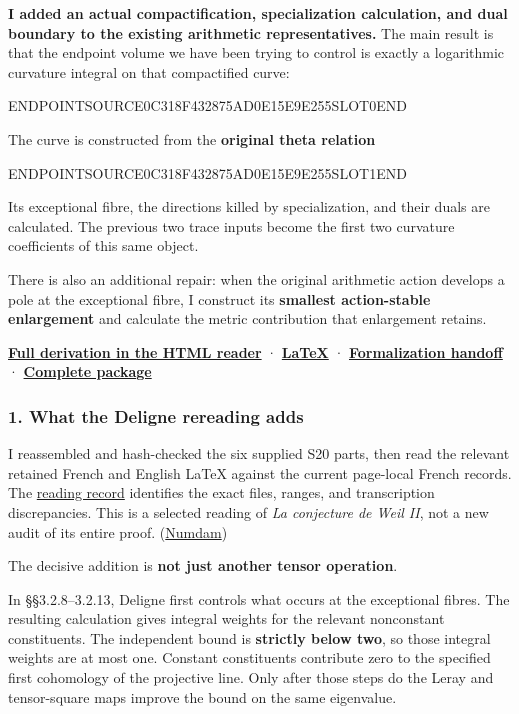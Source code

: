 \textbf{I added an actual compactification, specialization calculation, and dual boundary to the existing arithmetic representatives.} The main result is that the endpoint volume we have been trying to control is exactly a logarithmic curvature integral on that compactified curve:

ENDPOINTSOURCE0C318F432875AD0E15E9E255SLOT0END

The curve is constructed from the \textbf{original theta relation}

ENDPOINTSOURCE0C318F432875AD0E15E9E255SLOT1END

Its exceptional fibre, the directions killed by specialization, and their duals are calculated. The previous two trace inputs become the first two curvature coefficients of this same object.

There is also an additional repair: when the original arithmetic action develops a pole at the exceptional fibre, I construct its \textbf{smallest action-stable enlargement} and calculate the metric contribution that enlargement retains.

\href{sources/endpoint_user_sources/HISTORICAL_DOWNLOAD_LINKS.md}{\textbf{Full derivation in the HTML reader}} · \href{sources/endpoint_user_sources/HISTORICAL_DOWNLOAD_LINKS.md}{\textbf{LaTeX}} · \href{sources/endpoint_user_sources/HISTORICAL_DOWNLOAD_LINKS.md}{\textbf{Formalization handoff}} · \href{sources/endpoint_user_sources/HISTORICAL_DOWNLOAD_LINKS.md}{\textbf{Complete package}}

\subsubsection{1. What the Deligne rereading adds}\label{endpoint-curvature_original--what-the-deligne-rereading-adds}

I reassembled and hash-checked the six supplied S20 parts, then read the relevant retained French and English LaTeX against the current page-local French records. The \href{sources/endpoint_user_sources/HISTORICAL_DOWNLOAD_LINKS.md}{reading record} identifies the exact files, ranges, and transcription discrepancies. This is a selected reading of \emph{La conjecture de Weil II}, not a new audit of its entire proof. (\href{https://www.numdam.org/item/PMIHES_1980__52__137_0/}{Numdam})

The decisive addition is \textbf{not just another tensor operation}.

In §§3.2.8--3.2.13, Deligne first controls what occurs at the exceptional fibres. The resulting calculation gives integral weights for the relevant nonconstant constituents. The independent bound is \textbf{strictly below two}, so those integral weights are at most one. Constant constituents contribute zero to the specified first cohomology of the projective line. Only after those steps do the Leray and tensor-square maps improve the bound on the same eigenvalue.

